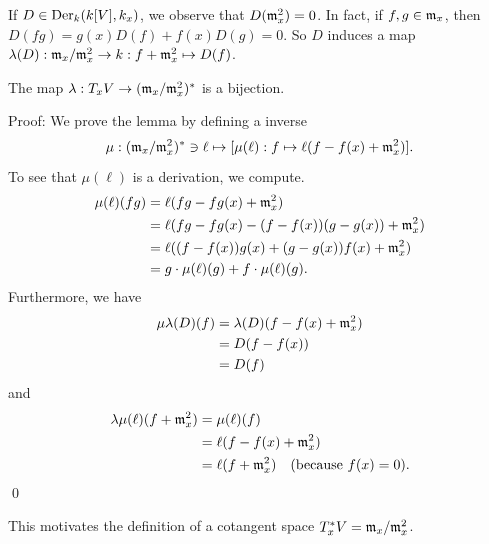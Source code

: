 If $D\in\text{Der}_k(k[V],k_x)$, we observe that $D(\mathfrak{m}_x^2)=0$. In fact, if $f,g\in\mathfrak{m}_x$, then 
$D(fg) = g(x) D(f) + f(x) D(g) = 0$. So $D$ induces a map $\lambda(D):\mathfrak{m}_x/\mathfrak{m}_x^2\to k: 
f+\mathfrak{m}_x^2\mapsto D(f)$. 
\begin{dang}
    \begin{lemma}
        The map $\lambda: T_x V \to (\mathfrak{m}_x/\mathfrak{m}_x^2)^*$ is a bijection.
    \end{lemma}
\end{dang}
Proof: We prove the lemma by defining a inverse 
\begin{equation}
    \mu:(\mathfrak{m}_x/\mathfrak{m}_x^2)^*\ni\ell\mapsto [\mu(\ell):f\mapsto \ell(f-f(x)+\mathfrak{m}_x^2)].
\end{equation}
To see that $\mu(\ell)$ is a derivation, we compute.
\begin{equation}
    \begin{split}
        \mu(\ell)(fg) &=\ell(fg -fg(x)+\mathfrak{m}_x^2)\\
        &=\ell(fg-fg(x)-(f-f(x))(g-g(x))+\mathfrak{m}_x^2)\\
        &=\ell((f-f(x))g(x)+(g-g(x))f(x)+\mathfrak{m}_x^2)\\
        &= g\cdot \mu(\ell)(g) + f\cdot \mu(\ell)(g).
    \end{split}
\end{equation}
Furthermore, we have 
\begin{equation}
    \begin{split}
        \mu\lambda(D)(f) &= \lambda(D)(f-f(x)+\mathfrak{m}_x^2)\\
        &=D(f-f(x))\\
        &=D(f)
    \end{split}
\end{equation}
and 
\begin{equation}
    \begin{split}
        \lambda\mu(\ell)(f+\mathfrak{m}_x^2) &= \mu(\ell)(f) \\ 
        &=\ell(f-f(x)+\mathfrak{m}_x^2)\\
        &=\ell(f+\mathfrak{m}_x^2)\quad(\text{because }f(x)=0).
    \end{split}
\end{equation}
\qed

This motivates the definition of a cotangent space $T_x^*V = \mathfrak{m}_x/\mathfrak{m}_x^2$.

